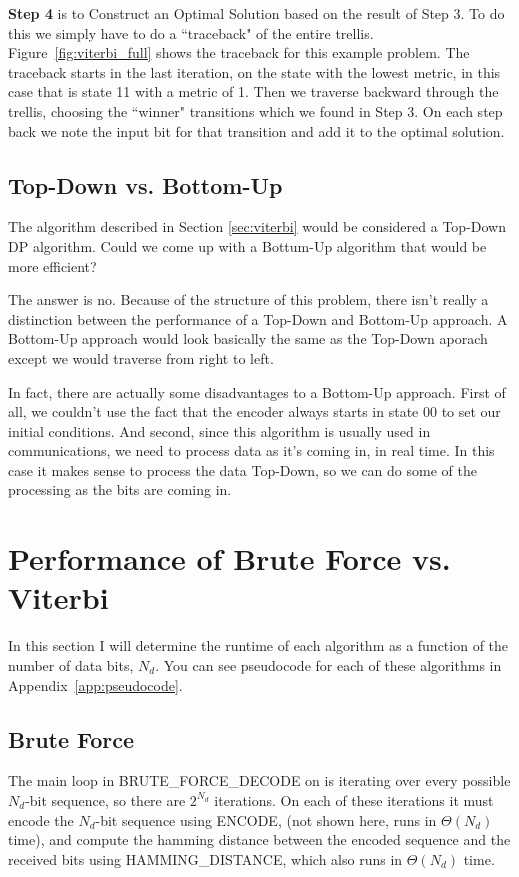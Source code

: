 \documentclass[11pt]{article}
\begin{document}
        \textbf{Step 4} is to Construct an Optimal Solution based on the result
        of Step 3.  To do this we simply have to do a ``traceback" of the entire
        trellis.  Figure~\ref{fig:viterbi_full} shows the traceback for
        this example problem. The traceback starts in the last iteration, on the
        state with the lowest metric, in this case that is state 11 with a
        metric of 1.  Then we traverse backward through the trellis,
        choosing the ``winner" transitions which we found in Step 3.  On
        each step back we note the input bit for that transition and add it to
        the optimal solution.
        
        \subsection{Top-Down vs. Bottom-Up}
        The algorithm described in Section \ref{sec:viterbi} would be considered
        a Top-Down DP algorithm.  Could we come up with a Bottum-Up algorithm
        that would be more efficient?

        The answer is no. Because of the structure of this problem, there isn't
        really a distinction between the performance of a Top-Down and Bottom-Up
        approach.  A Bottom-Up approach would look basically the same as the Top-Down aporach
        except we would traverse from right to left.
        
        In fact, there are actually some disadvantages to a Bottom-Up approach. 
        First of all, we couldn't use the fact that the encoder always starts
        in state 00 to set our initial conditions.  And second, since this algorithm is usually used
        in communications, we need to process data as it's coming in, in
        real time.  In this case it makes sense to process the data Top-Down, so
        we can do some of the processing as the bits are coming in.

    \section{Performance of Brute Force vs. Viterbi}
        In this section I will determine the runtime of each algorithm as a
        function of the number of data bits, $N_d$.  You can see pseudocode for
        each of these algorithms in Appendix~\ref{app:pseudocode}.
        \subsection{Brute Force}
        The main loop in BRUTE\_FORCE\_DECODE on is iterating over 
        every possible $N_d$-bit sequence, so there are $2^{N_d}$ iterations.  On each
        of these iterations it must encode the $N_d$-bit sequence using ENCODE,
        (not shown here, runs in $\Theta(N_d)$ time), and compute the hamming
        distance between the encoded sequence and the received bits using
        HAMMING\_DISTANCE, which also runs in $\Theta(N_d)$ time.
\end{document}
